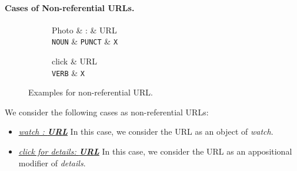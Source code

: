 \documentclass[11pt,a4paper]{article}
\begin{document}
\paragraph{Cases of Non-referential URLs.}
\begin{figure}[t]
\centering
\small
\begin{subfigure}[t]{0.45\columnwidth}
	\centering
	\begin{dependency}[edge slant=2, text only label, label style=above]
	\begin{deptext}
		Photo \& : \& URL \\
		\texttt{NOUN} \& \texttt{PUNCT} \& \texttt{X} \\
	\end{deptext}
	\end{dependency}
\end{subfigure}
\begin{subfigure}[t]{0.45\columnwidth}
	\centering
	\begin{dependency}[edge slant=2, text only label, label style=above]
	\begin{deptext}
		click \& URL \\
		\texttt{VERB} \& \texttt{X} \\
	\end{deptext}
\end{dependency}
\end{subfigure}
\caption{Examples for non-referential URL.}\label{fig:non-ref-url}
\end{figure}

We consider the following cases as non-referential URLs:
\begin{itemize}
	\item \underline{\textit{watch : \textbf{URL}}} 
	In this case, we consider the URL as an object of \textit{watch}.
	\item \underline{\textit{click for details: \textbf{URL}}}
	In this case, we consider the URL as an appositional modifier of \textit{details}.
\end{itemize}
\end{document}
